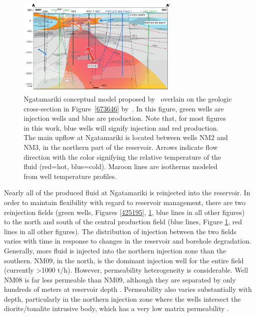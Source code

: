 \begin{figure}
\begin{center}
\includegraphics[width=0.7\textwidth,height=0.7\textheight,keepaspectratio]{Chapter_1_Intro/figures/Chamerfort_2015_fig9_model/Chambefort_2015_fig9_model_lores}
\caption[Cross-section of the Ngatamariki conceptual model]{{
Ngatamariki conceptual model proposed by~\protect\citet{Boseley_2010} overlain on
the geologic cross-section in Figure~{\ref{673646}}
by~\protect\citet{Chambefort_2016}. In this figure, green wells are injection wells
and blue are production. Note that, for most figures in this work, blue
wells will signify injection and red production. The main upflow at
Ngatamariki is located between wells NM2 and NM3, in the northern part
of the reservoir. Arrows indicate flow direction with the color
signifying the relative temperature of the fluid (red=hot, blue=cold).
Maroon lines are isotherms modeled from well temperature profiles.
{\label{813462}}%
}}
\end{center}
\end{figure}

Nearly all of the produced fluid at Ngatamariki is reinjected into the reservoir. In order to maintain flexibility with regard to reservoir management, there are two reinjection fields (green wells, Figures \ref{425195}, \ref{813462}, blue lines in all other figures) to the north and south of the central production field (blue lines, Figure \ref{813462}, red lines in all other figures). The distribution of injection between the two fields varies with time in response to changes in the reservoir and borehole degradation. Generally, more fluid is injected into the northern injection zone than the southern. NM09, in the north, is the dominant injection well for the entire field (currently \textgreater1000 t/h). However, \gls{permeability} heterogeneity is considerable. Well NM08 is far less permeable than NM09, although they are separated by only hundreds of meters at reservoir depth \citep{Clearwater_2015}. Permeability also varies substantially with depth, particularly in the northern injection zone where the wells intersect the diorite\slash{tonalite} intrusive body, which has a very low matrix \gls{permeability} \citep{Cant_2018}.

